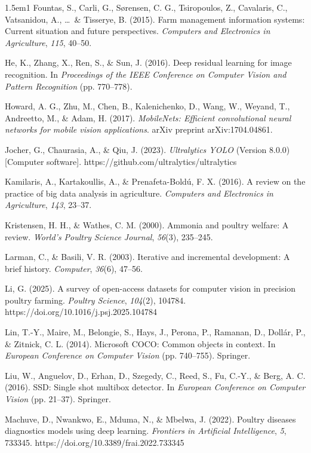 \documentclass[12pt,a4paper]{report}
\begin{document}
\begin{hangparas}{1.5em}{1}
Fountas, S., Carli, G., S{\o}rensen, C. G., Tsiropoulos, Z., Cavalaris, C., Vatsanidou, A., \ldots\ \& Tisserye, B. (2015). Farm management information systems: Current situation and future perspectives. \textit{Computers and Electronics in Agriculture}, \textit{115}, 40--50.

He, K., Zhang, X., Ren, S., \& Sun, J. (2016). Deep residual learning for image recognition. In \textit{Proceedings of the IEEE Conference on Computer Vision and Pattern Recognition} (pp. 770--778).

Howard, A. G., Zhu, M., Chen, B., Kalenichenko, D., Wang, W., Weyand, T., Andreetto, M., \& Adam, H. (2017). \textit{MobileNets: Efficient convolutional neural networks for mobile vision applications}. arXiv preprint arXiv:1704.04861.

Jocher, G., Chaurasia, A., \& Qiu, J. (2023). \textit{Ultralytics YOLO} (Version 8.0.0) [Computer software]. https://github.com/ultralytics/ultralytics

Kamilaris, A., Kartakoullis, A., \& Prenafeta-Bold\'u, F. X. (2016). A review on the practice of big data analysis in agriculture. \textit{Computers and Electronics in Agriculture}, \textit{143}, 23--37.

Kristensen, H. H., \& Wathes, C. M. (2000). Ammonia and poultry welfare: A review. \textit{World's Poultry Science Journal}, \textit{56}(3), 235--245.

Larman, C., \& Basili, V. R. (2003). Iterative and incremental development: A brief history. \textit{Computer}, \textit{36}(6), 47--56.

Li, G. (2025). A survey of open-access datasets for computer vision in precision poultry farming. \textit{Poultry Science}, \textit{104}(2), 104784. https://doi.org/10.1016/j.psj.2025.104784

Lin, T.-Y., Maire, M., Belongie, S., Hays, J., Perona, P., Ramanan, D., Doll\'ar, P., \& Zitnick, C. L. (2014). Microsoft COCO: Common objects in context. In \textit{European Conference on Computer Vision} (pp. 740--755). Springer.

Liu, W., Anguelov, D., Erhan, D., Szegedy, C., Reed, S., Fu, C.-Y., \& Berg, A. C. (2016). SSD: Single shot multibox detector. In \textit{European Conference on Computer Vision} (pp. 21--37). Springer.

Machuve, D., Nwankwo, E., Mduma, N., \& Mbelwa, J. (2022). Poultry diseases diagnostics models using deep learning. \textit{Frontiers in Artificial Intelligence}, \textit{5}, 733345. https://doi.org/10.3389/frai.2022.733345


\end{hangparas}
\end{document}
